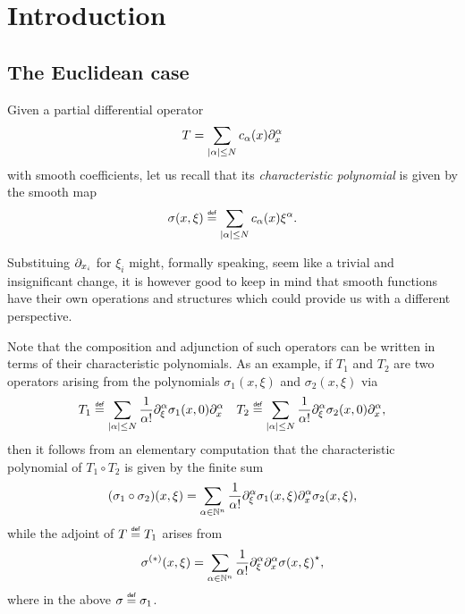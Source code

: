 \chapter{Introduction}

\section{The Euclidean case}

Given a partial differential operator
\begin{align*}
    T = \sum_{\abs \alpha \leq N} c_\alpha(x) \iD{x^\alpha}
\end{align*}
with smooth coefficients,
let us recall that its \emph{characteristic polynomial} is given by the smooth map
\begin{align*}
    \sigma(x, \xi) \defeq \sum_{\abs \alpha \leq N} c_\alpha(x) \xi^\alpha.
\end{align*}

Substituing $\iD{{x_i} }$ for $\xi_i$ might, formally speaking, seem like a trivial and insignificant change,
it is however good to keep in mind
that smooth functions have their own operations and structures
which could provide us with a different perspective.

Note that the composition and adjunction of such operators can be written in terms of their characteristic polynomials.
As an example,
if $T_1$ and $T_2$ are two operators arising from the polynomials $\sigma_1(x, \xi)$ and $\sigma_2(x, \xi)$ via
\begin{align*}
    T_1 \defeq \sum_{\abs \alpha \leq N} \frac 1 {\alpha!} \iD{\xi^\alpha} \sigma_1(x, 0) \iD{x^\alpha}
    \quad
    T_2 \defeq \sum_{\abs \alpha \leq N} \frac 1 {\alpha!} \iD{\xi^\alpha} \sigma_2(x, 0) \iD{x^\alpha},
\end{align*}
then it follows from an elementary computation
that the characteristic polynomial of $T_1 \circ T_2$ is given by the finite sum
\begin{align}
    (\sigma_1 \circ \sigma_2)(x, \xi) = \sum_{\alpha \in \N^n} \frac 1 {\alpha!} \iD{\xi^\alpha} \sigma_1(x, \xi) \iD{x^\alpha} \sigma_2(x, \xi)
    \label{eq:composition_formula_for_characteristic_polynomials},
\end{align}
while the adjoint of $T \defeq T_1$ arises from
\begin{align}
    \sigma^{(*)}(x, \xi) = \sum_{\alpha \in \N^n} \frac 1 {\alpha!} \iD{\xi^\alpha} \iD{x^\alpha} \adj{\sigma(x, \xi)},
    \label{eq:adjunction_formula_for_characteristic_polynomials}
\end{align}
where in the above $\sigma \defeq \sigma_1$.

